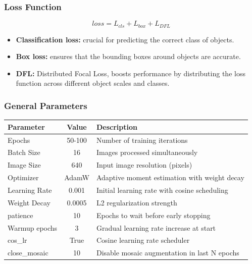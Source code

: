 \documentclass[serif]{beamer}  %
\begin{document}
\begin{frame}
\frametitle{Loss Function}
$$
loss = L_{cls} + L_{box} + L_{DFL}
$$
\begin{itemize}
	\item \textbf{Classification loss:} crucial for predicting the correct class of objects.
	\item \textbf{Box loss:} ensures that the bounding boxes around objects are accurate.
	\item \textbf{DFL:} Distributed Focal Loss, boosts performance by distributing the loss function across different object scales and classes.
\end{itemize}
\end{frame}

\begin{frame}
\frametitle{General Parameters}
\begin{center}
\small
\begin{tabular}{|l|c|p{5.5cm}|}
\hline
\textbf{Parameter} & \textbf{Value} & \textbf{Description} \\
\hline
Epochs & 50-100 & Number of training iterations \\
\hline
Batch Size & 16 & Images processed simultaneously \\
\hline
Image Size & 640 & Input image resolution (pixels) \\
\hline
Optimizer & AdamW & Adaptive moment estimation with weight decay \\
\hline
Learning Rate & 0.001 & Initial learning rate with cosine scheduling \\
\hline
Weight Decay & 0.0005 & L2 regularization strength \\
\hline
patience & 10 & Epochs to wait before early stopping \\
\hline
Warmup epochs & 3 & Gradual learning rate increase at start \\
\hline
cos\_lr & True & Cosine learning rate scheduler \\
\hline
close\_mosaic & 10 & Disable mosaic augmentation in last N epochs \\
\hline
\end{tabular}
\end{center}
\end{frame}
\end{document}
